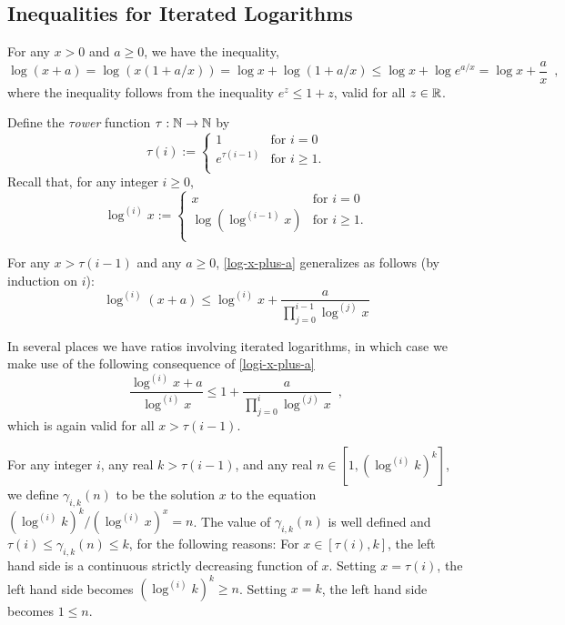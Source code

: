 \documentclass[kpfonts]{patmorin}
\theoremstyle{named}
\begin{document}
\subsection{Inequalities for Iterated Logarithms}

For any $x> 0$ and $a\ge 0$, we have the inequality,
\begin{equation}
    \log (x+a) = \log (x(1+a/x)) = \log x + \log(1+a/x) \le \log x + \log e^{a/x} = \log x + \frac{a}{x} \enspace , \label{log-x-plus-a}
\end{equation}
where the inequality follows from the inequality $e^z \le 1+z$, valid for all $z\in\mathbb{R}$.

Define the \emph{$\tau$ower} function $\tau:\mathbb{N}\to\mathbb{N}$ by
\[
  \tau(i) :=
    \begin{cases}
        1 & \text{for $i=0$} \\
        e^{\tau(i-1)} & \text{for $i\ge 1$.} \\
    \end{cases}
\]
Recall that, for any integer $i\ge 0$,
\[
    \log^{(i)} x :=
      \begin{cases}
          x & \text{for $i=0$} \\
          \log\left(\log^{(i-1)}x\right) & \text{for $i\ge 1$.} \\
      \end{cases}
\]

For any $x > \tau(i-1)$ and any $a\ge 0$, \cref{log-x-plus-a} generalizes as follows (by induction on $i$):
\begin{equation}
    \log^{(i)}(x+a) \le \log^{(i)} x + \frac{a}{\prod_{j=0}^{i-1}\log^{(j)} x} \label{logi-x-plus-a}
\end{equation}

In several places we have ratios involving iterated logarithms, in which case we make use of the following consequence of \cref{logi-x-plus-a}
\begin{equation}
    \frac{\log^{(i)} x+a}{\log^{(i)} x} \le 1 + \frac{a}{\prod_{j=0}^{i}\log^{(j)} x} \enspace, \label{logi-ratio}
\end{equation}
which is again valid for all $x> \tau(i-1)$.

For any integer $i$, any real $k>\tau(i-1)$, and any real $n\in[1,(\log^{(i)} k)^k]$, we define $\gamma_{i,k}(n)$ to be the solution $x$ to the equation $(\log^{(i)} k)^k/(\log^{(i)} x)^{x}=n$.  The value of $\gamma_{i,k}(n)$ is well defined and $\tau(i)\le \gamma_{i,k}(n)\le k$, for the following reasons:  For $x\in[\tau(i),k]$, the left hand side is a continuous strictly decreasing function of $x$. Setting $x=\tau(i)$, the left hand side becomes $(\log^{(i)} k)^k \ge n$. Setting $x=k$, the left hand side becomes $1\le n$.
\end{document}
